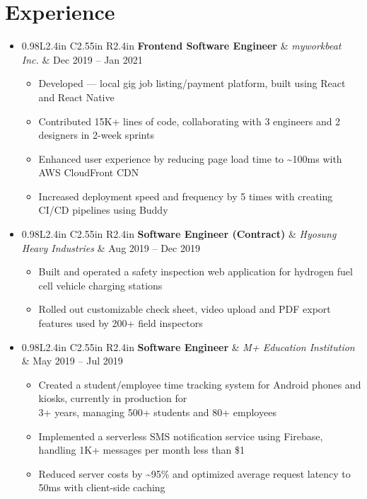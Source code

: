 \documentclass[letterpaper,11pt]{article}
\makeatletter
\newcommand{\myuline}[1]{%
  \uline{\phantom{#1}}%
  \llap{\contour{white}{#1}}%
}
\newcommand{\resumeItem}[1]{
  \item\small{
    {#1 \vspace{-2pt}}
  }
}
\newcommand{\resumeSubheading}[4]{
  \item
    \begin{tabular*}{0.98\textwidth}[t]{l@{\extracolsep{\fill}}r}
      \textbf{#1} & #2 \\
      \textit{\small#3} & \textit{\small #4} \\
    \end{tabular*}\vspace{-6pt}
}
\newcommand{\resumeEntry}[3]{
  \item
    \begin{tabular*}{0.98\textwidth}{L{2.4in} C{2.55in} R{2.4in}}
      \textbf{#1} & \textit{\small#2} & {#3} \\
    \end{tabular*}\vspace{-5.5pt}
}
\newcommand{\resumeSubHeadingListStart}{\begin{itemize}[leftmargin=0.1in, label={}]}
\newcommand{\resumeSubHeadingListEnd}{\end{itemize}}
\newcommand{\resumeItemListStart}{\begin{itemize}[leftmargin=0.25in]}
\newcommand{\resumeItemListEnd}{\end{itemize}\vspace{-5.5pt}}
\makeatother
\begin{document}
\section{Experience}
  \resumeSubHeadingListStart

    \resumeEntry
      {Frontend Software Engineer}{myworkbeat Inc.}{Dec 2019 -- Jan 2021}
      \resumeItemListStart
        \resumeItem{Developed \href{https://apple.co/3La39ZX}{\myuline{\textbf{sugosugo}}} --- local gig job listing/payment platform, built using React and React Native}
        \resumeItem{Contributed 15K+ lines of code, collaborating with 3 engineers and 2 designers in 2-week sprints}
        \resumeItem{Enhanced user experience by reducing page load time to \textasciitilde{}100ms with AWS CloudFront CDN}
        \resumeItem{Increased deployment speed and frequency by 5 times with creating CI/CD pipelines using Buddy}
      \resumeItemListEnd

    \resumeEntry
      {Software Engineer (Contract)}{Hyosung Heavy Industries}{Aug 2019 -- Dec 2019}
      \resumeItemListStart
        \resumeItem{Built and operated a safety inspection web application for hydrogen fuel cell vehicle charging stations}
        \resumeItem{Rolled out customizable check sheet, video upload and PDF export features used by 200+ field inspectors}
      \resumeItemListEnd

    \resumeEntry
      {Software Engineer}{M+ Education Institution}{May 2019 -- Jul 2019}
      \resumeItemListStart
        \resumeItem{Created a student/employee time tracking system for Android phones and kiosks, currently in production for \\ 3+ years, managing 500+ students and 80+ employees}
        \resumeItem{Implemented a serverless SMS notification service using Firebase, handling 1K+ messages per month less than \$1}
        \resumeItem{Reduced server costs by \textasciitilde{}95\% and optimized average request latency to 50ms with client-side caching}
      \resumeItemListEnd


  \resumeSubHeadingListEnd
\end{document}
